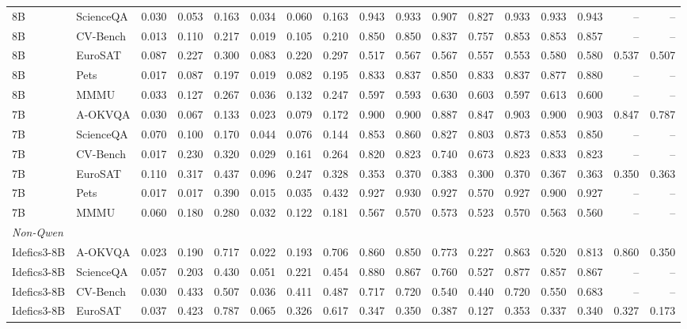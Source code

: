 \begin{tabular}{llrrrrrr rrrr rrrrr}
8B & ScienceQA & 0.030 & 0.053 & 0.163 & 0.034 & 0.060 & 0.163 & 0.943 & 0.933 & 0.907 & 0.827 & 0.933 & 0.933 & 0.943 & -- & -- \\
8B & CV-Bench & 0.013 & 0.110 & 0.217 & 0.019 & 0.105 & 0.210 & 0.850 & 0.850 & 0.837 & 0.757 & 0.853 & 0.853 & 0.857 & -- & -- \\
8B & EuroSAT & 0.087 & 0.227 & 0.300 & 0.083 & 0.220 & 0.297 & 0.517 & 0.567 & 0.567 & 0.557 & 0.553 & 0.580 & 0.580 & 0.537 & 0.507 \\
8B & Pets & 0.017 & 0.087 & 0.197 & 0.019 & 0.082 & 0.195 & 0.833 & 0.837 & 0.850 & 0.833 & 0.837 & 0.877 & 0.880 & -- & -- \\
8B & MMMU & 0.033 & 0.127 & 0.267 & 0.036 & 0.132 & 0.247 & 0.597 & 0.593 & 0.630 & 0.603 & 0.597 & 0.613 & 0.600 & -- & -- \\
7B & A-OKVQA & 0.030 & 0.067 & 0.133 & 0.023 & 0.079 & 0.172 & 0.900 & 0.900 & 0.887 & 0.847 & 0.903 & 0.900 & 0.903 & 0.847 & 0.787 \\
7B & ScienceQA & 0.070 & 0.100 & 0.170 & 0.044 & 0.076 & 0.144 & 0.853 & 0.860 & 0.827 & 0.803 & 0.873 & 0.853 & 0.850 & -- & -- \\
7B & CV-Bench & 0.017 & 0.230 & 0.320 & 0.029 & 0.161 & 0.264 & 0.820 & 0.823 & 0.740 & 0.673 & 0.823 & 0.833 & 0.823 & -- & -- \\
7B & EuroSAT & 0.110 & 0.317 & 0.437 & 0.096 & 0.247 & 0.328 & 0.353 & 0.370 & 0.383 & 0.300 & 0.370 & 0.367 & 0.363 & 0.350 & 0.363 \\
7B & Pets & 0.017 & 0.017 & 0.390 & 0.015 & 0.035 & 0.432 & 0.927 & 0.930 & 0.927 & 0.570 & 0.927 & 0.900 & 0.927 & -- & -- \\
7B & MMMU & 0.060 & 0.180 & 0.280 & 0.032 & 0.122 & 0.181 & 0.567 & 0.570 & 0.573 & 0.523 & 0.570 & 0.563 & 0.560 & -- & -- \\
\midrule
\multicolumn{17}{l}{\textit{Non-Qwen}} \\
Idefics3-8B & A-OKVQA & 0.023 & 0.190 & 0.717 & 0.022 & 0.193 & 0.706 & 0.860 & 0.850 & 0.773 & 0.227 & 0.863 & 0.520 & 0.813 & 0.860 & 0.350 \\
Idefics3-8B & ScienceQA & 0.057 & 0.203 & 0.430 & 0.051 & 0.221 & 0.454 & 0.880 & 0.867 & 0.760 & 0.527 & 0.877 & 0.857 & 0.867 & -- & -- \\
Idefics3-8B & CV-Bench & 0.030 & 0.433 & 0.507 & 0.036 & 0.411 & 0.487 & 0.717 & 0.720 & 0.540 & 0.440 & 0.720 & 0.550 & 0.683 & -- & -- \\
Idefics3-8B & EuroSAT & 0.037 & 0.423 & 0.787 & 0.065 & 0.326 & 0.617 & 0.347 & 0.350 & 0.387 & 0.127 & 0.353 & 0.337 & 0.340 & 0.327 & 0.173 \\

\end{tabular}
